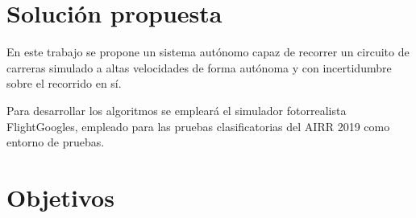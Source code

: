 \section{Solución propuesta}


En este trabajo se propone un sistema autónomo capaz de recorrer un circuito de carreras 
simulado a altas velocidades de forma autónoma y con incertidumbre sobre el recorrido en sí.

Para desarrollar los algoritmos se empleará el simulador fotorrealista FlightGoogles, empleado para las pruebas clasificatorias del AIRR 2019 como entorno de pruebas.






 
\section{Objetivos}
